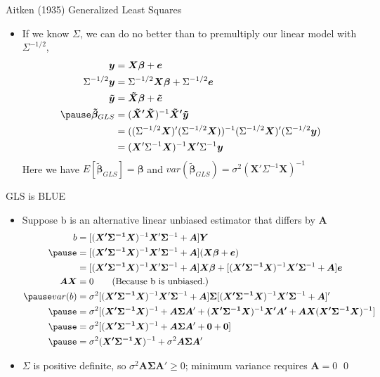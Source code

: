 \documentclass[aspectratio=169, handout]{beamer}
\numberwithin{equation}{section}
\begin{document}
\begin{frame}{Aitken (1935) Generalized Least Squares}
\begin{itemize}
\item If we know $\Sigma$, we can do no better than to premultiply our linear model with  $\Sigma^{-1/2}$,
\begin{align*}
\bm{y}&=\bm{X\beta}+\bm{e}\\ 
\Sigma^{-1/2}\bm{y}&=\Sigma^{-1/2}\bm{X\beta}+\Sigma^{-1/2}\bm{e}\\
\bm{\tilde{y}}&=\bm{\tilde{X}\beta}+\bm{\tilde{e}}\\\pause
\bm{\tilde{\beta}}_{GLS}&=(\bm{\tilde{X}'\tilde{X}})^{-1}\bm{\tilde{X}'\tilde{y}}\\
&=((\Sigma^{-1/2}\bm{X})'(\Sigma^{-1/2}\bm{X}))^{-1}(\Sigma^{-1/2}\bm{X})'(\Sigma^{-1/2}\bm{y})\\
&=(\bm{X}'\Sigma^{-1}\bm{X})^{-1}\bm{X}'\Sigma^{-1}\bm{y}
\end{align*}
Here we have $E[\bm{\tilde{\beta}}_{GLS}]=\bm{\beta}$ and 
$var(\bm{\tilde{\beta}}_{GLS})=\sigma^2(\bm{X}'\Sigma^{-1}\bm{X})^{-1}$
\end{itemize}
\end{frame}


\begin{frame}{GLS is BLUE}
\begin{itemize}
\item Suppose b is an alternative linear unbiased estimator that differs by $\bm{A}$
\begin{align*}
b&=[(\bm{X'\Sigma^{-1} X})^{-1}\bm{X}'\bm{\Sigma}^{-1}+\bm{A}]\bm{Y}\\\pause
&=[(\bm{X'\Sigma^{-1} X})^{-1}\bm{X}'\bm{\Sigma}^{-1}+\bm{A}](\bm{X\beta}+\bm{e})\\
&=[(\bm{X'\Sigma^{-1} X})^{-1}\bm{X}'\bm{\Sigma}^{-1}+\bm{A}]\bm{X\beta}+[(\bm{X'\Sigma^{-1} X})^{-1}\bm{X}'\bm{\Sigma}^{-1}+\bm{A}]\bm{e}\\
\bm{AX}&=0\tag{Because b is unbiased.}\\ \pause
var(b)&=\sigma^2[(\bm{X'\Sigma^{-1} X})^{-1}\bm{X}'\bm{\Sigma}^{-1}+\bm{A}]\bm{\Sigma} [(\bm{X'\Sigma^{-1} X})^{-1}\bm{X}'\bm{\Sigma}^{-1}+\bm{A}]'\\\pause
&=\sigma^2[(\bm{X'\Sigma^{-1} X})^{-1} + \bm{A\Sigma A}'+(\bm{X'\Sigma^{-1} X})^{-1}\bm{X'A'}+\bm{AX}(\bm{X'\Sigma^{-1} X})^{-1}]\\\pause
&=\sigma^2[(\bm{X'\Sigma^{-1} X})^{-1} + \bm{A\Sigma A}'+\bm{0}+\bm{0}]\\\pause
&=\sigma^2(\bm{X'\Sigma^{-1} X})^{-1} + \sigma^2\bm{A\Sigma A}'
\end{align*}
\item $\Sigma$ is positive definite, so $\sigma^2\bm{A\Sigma A}'\geq 0$; minimum variance requires $\bm{A}=0$ \qed
\end{itemize}
\end{frame}
\end{document}
